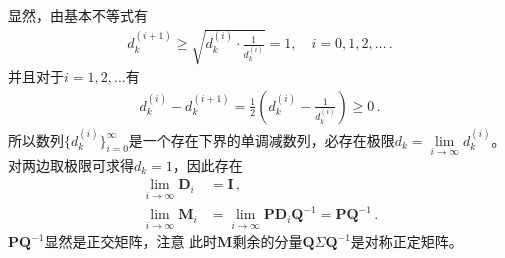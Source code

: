 \begin{prove}
    显然，由基本不等式有
    \begin{align}
        d_k^{(i+1)}\ge\sqrt{d_k^{(i)}\cdot\frac{1}{d_k^{(i)}}}=1,\quad i=0,1,2,\ldots\, .
    \end{align}
    并且对于$i=1,2,\ldots$有
    \begin{align}
        d_k^{(i)}-d_k^{(i+1)}=\frac{1}{2}\left(d_k^{(i)}-\frac{1}{d_k^{(i)}}\right)\ge0\, .
    \end{align}
    所以数列$\{d_k^{(i)}\}_{i=0}^{\infty}$是一个存在下界的单调减数列，必存在极限$d_k=\lim\limits_{i\rightarrow\infty}{d_k^{(i)}}$。
    对两边取极限可求得$d_k=1$，因此存在
    \begin{align}
        \lim\limits_{i\rightarrow\infty}\bm D_i & =\bm I\, ,                                                                  \\
        \lim\limits_{i\rightarrow\infty}\bm M_i & =\lim\limits_{i\rightarrow\infty}\bm P\bm D_i\bm Q^{-1}=\bm P\bm Q^{-1}\, .
    \end{align}
    $\bm P\bm Q^{-1}$显然是正交矩阵，注意
    此时$\bm M$剩余的分量$\bm Q\bm \varSigma\bm Q^{-1}$是对称正定矩阵。
\end{prove}

